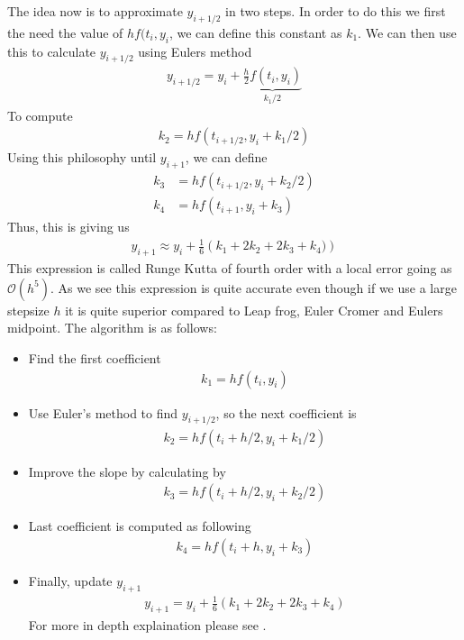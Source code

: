 \documentclass[a4paper, 10pt]{article}
\begin{document}
The idea now is to approximate $y_{i+1/2}$ in two steps. In order to do this we first the need the value of
$hf(t_{i},y_{i}$, we can define this constant as $k_{1}$. We can then use this to calculate $y_{i+1/2}$ using Eulers method
\begin{align}
  y_{i+1/2} = y_{i} + \underbrace{\frac{h}{2}f(t_{i},y_{i})}_{k_{1}/2}
\end{align}
To compute
\begin{align}
  k_{2} = hf(t_{i+1/2}, y_{i} + k_{1}/2)
\end{align}
Using this philosophy until $y_{i+1}$, we can define
\begin{align}
  k_{3} &= hf(t_{i+1/2}, y_{i} + k_{2}/2) \\
  k_{4} & = hf(t_{i+1}, y_{i} + k_{3})
\end{align}
Thus, this is giving us
\begin{align}
    y_{i+1} \approx y_{i} + \frac{1}{6}\left(k_{1} + 2k_{2} + 2k_{3} + k_{4})\right)
\end{align}
This expression is called Runge Kutta of fourth order with a local error
going as $\mathcal{O}(h^{5})$. As we see this expression is quite accurate even though if we use
a large stepsize $h$ it is quite superior compared to Leap frog, Euler Cromer and Eulers midpoint.
The algorithm is as follows:
\begin{itemize}
\item Find the first coefficient
  \begin{align*}
    k_{1} = hf(t_{i},y_{i})
  \end{align*}
\item Use Euler's method to find $y_{i+1/2}$, so the next coefficient is
  \begin{align*}
    k_{2} = hf(t_{i}+h/2, y_{i}+k_{1}/2)
  \end{align*}
\item Improve the slope by calculating by
  \begin{align*}
    k_{3} = hf(t_{i} + h/2, y_{i}+k_{2}/2)
  \end{align*}
\item Last coefficient is computed as following
  \begin{align*}
    k_{4} = hf(t_{i} + h, y_{i} + k_{3})
  \end{align*}
\item Finally, update $y_{i+1}$
  \begin{align*}
    y_{i+1} = y_{i} + \frac{1}{6}\left(k_{1} + 2k_{2} + 2k_{3} + k_{4}\right)
  \end{align*}
  For more in depth explaination please see \cite{morten}.
\end{itemize}
\end{document}
